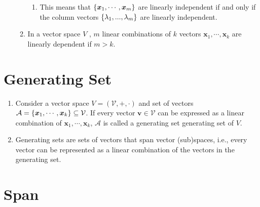 \begin{enumerate}
\begin{enumerate}
\begin{enumerate}
            \item This means that $\left\{\bm{x}_1, \cdots , \bm{x}_m\right\}$ are linearly independent if and only if the column vectors $\left\{\lambda_1, . . . , \lambda_m\right\}$ are linearly independent.
            \hfill \cite{mfml/book/mml/Deisenroth-Faisal-Ong}
        \end{enumerate}

        \item In a vector space $V$ , $m$ linear combinations of $k$ vectors $\bm{x}_1, \cdots , \bm{x}_k$ are linearly dependent if $m > k$.
        \hfill \cite{mfml/book/mml/Deisenroth-Faisal-Ong}
    \end{enumerate}
\end{enumerate}





\section{Generating Set}

\begin{enumerate}
    \item
    \begin{definition}
        Consider a vector space $V = (\mathcal{V}, +, \cdot)$ and set of vectors $\mathcal{A} = \left\{\bm{x}_1, \cdots , \bm{x}_k\right\} \subseteq \mathcal{V}$.
        If every vector $\bm{v} \in \mathcal{V}$ can be expressed as a linear combination of $\bm{x}_1, \cdots , \bm{x}_k$, $\mathcal{A}$ is called a generating set generating set of $V$.
        \hfill \cite{mfml/book/mml/Deisenroth-Faisal-Ong}
    \end{definition}

    \item Generating sets are sets of vectors that span vector (sub)spaces, i.e., every vector can be represented as a linear combination of the vectors in the generating set.
    \hfill \cite{mfml/book/mml/Deisenroth-Faisal-Ong}
\end{enumerate}








\section{Span}

